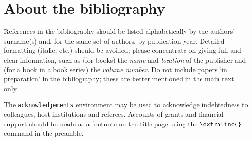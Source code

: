 \documentclass{lms}
\begin{document}
\oneappendix %
\section{About the bibliography}
References in the bibliography should be listed alphabetically by
the authors' surname(s) and, for the same set of authors, by
publication year. Detailed formatting (italic, etc.) should be
avoided; please concentrate on giving full and clear information,
such as (for books) the \textit{name} and \textit{location} of the
publisher and (for a book in a book series) the \textit{volume
number}. Do not include papers `in preparation' in the bibliography;
these are better mentioned in the main text only.

\begin{acknowledgements}\label{ackref}
The \verb"acknowledgements" environment may be used to acknowledge
indebtedness to colleagues, host institutions and referees. Accounts
of grants and financial support should be made as a footnote on the
title page using the \verb"\extraline{}" command in the preamble.
\end{acknowledgements}

\end{document}
